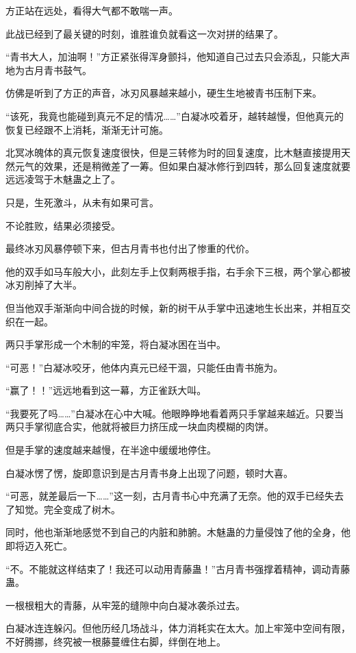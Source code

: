 
\begin{this_body}

方正站在远处，看得大气都不敢喘一声。

此战已经到了最关键的时刻，谁胜谁负就看这一次对拼的结果了。

“青书大人，加油啊！”方正紧张得浑身颤抖，他知道自己过去只会添乱，只能大声地为古月青书鼓气。

仿佛是听到了方正的声音，冰刃风暴越来越小，硬生生地被青书压制下来。

“该死，我竟也能碰到真元不足的情况……”白凝冰咬着牙，越转越慢，但他真元的恢复已经跟不上消耗，渐渐无计可施。

北冥冰魄体的真元恢复速度很快，但是三转修为时的回复速度，比木魅直接提用天然元气的效果，还是稍微差了一筹。但如果白凝冰修行到四转，那么回复速度就要远远凌驾于木魅蛊之上了。

只是，生死激斗，从未有如果可言。

不论胜败，结果必须接受。

最终冰刃风暴停顿下来，但古月青书也付出了惨重的代价。

他的双手如马车般大小，此刻左手上仅剩两根手指，右手余下三根，两个掌心都被冰刃削掉了大半。

但当他双手渐渐向中间合拢的时候，新的树干从手掌中迅速地生长出来，并相互交织在一起。

两只手掌形成一个木制的牢笼，将白凝冰困在当中。

“可恶！”白凝冰咬牙，他体内真元已经干涸，只能任由青书施为。

“赢了！！”远远地看到这一幕，方正雀跃大叫。

“我要死了吗……”白凝冰在心中大喊。他眼睁睁地看着两只手掌越来越近。只要当两只手掌彻底合实，他就将被巨力挤压成一块血肉模糊的肉饼。

但是手掌的速度越来越慢，在半途中缓缓地停住。

白凝冰愣了愣，旋即意识到是古月青书身上出现了问题，顿时大喜。

“可恶，就差最后一下……”这一刻，古月青书心中充满了无奈。他的双手已经失去了知觉。完全变成了树木。

同时，他也渐渐地感觉不到自己的内脏和肺腑。木魅蛊的力量侵蚀了他的全身，他即将迈入死亡。

“不。不能就这样结束了！我还可以动用青藤蛊！”古月青书强撑着精神，调动青藤蛊。

一根根粗大的青藤，从牢笼的缝隙中向白凝冰袭杀过去。

白凝冰连连躲闪。但他历经几场战斗，体力消耗实在太大。加上牢笼中空间有限，不好腾挪，终究被一根藤蔓缠住右脚，绊倒在地上。


\end{this_body}

